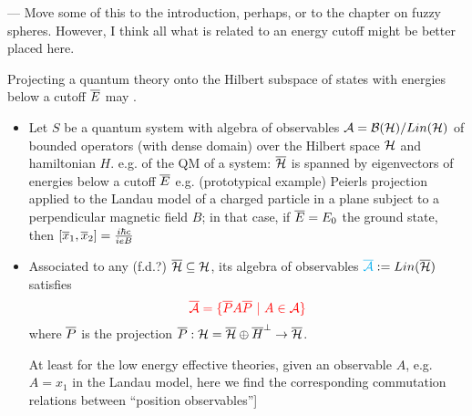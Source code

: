 { \color{gray}
    --- Move some of this to the introduction, perhaps, or to the chapter on fuzzy spheres. However, I think all what is related to an energy cutoff might be better placed here.
    
    \cite{FioreTheCase2020} Projecting a quantum theory onto the Hilbert subspace of states with energies below a cutoff $\overline{E}$ may . 
    
        \begin{itemize}
            
        \item Let $S$ be a quantum system with algebra of observables $\mathcal A = \mathcal B(\mathcal H)/Lin(\mathcal H)$ of bounded operators (with dense domain) over the Hilbert space $\mathcal H$ and hamiltonian $H$. e.g.  of the QM of a system: $\overline{\mathcal H}$ is spanned by eigenvectors of energies below a cutoff $\overline{E}$ e.g. (prototypical example) Peierls projection applied to the Landau model of a charged particle in a plane subject to a perpendicular magnetic field $B$; in that case, if $\overline{E} = E_0$ the ground state, then $[\overline{x}_1, \overline{x}_2] = \frac{i\hbar c}{ie B}$
        
        \item Associated to any (f.d.?) $\overline{\mathcal H} \subseteq \mathcal H$, its algebra of observables $\textcolor{cyan}{\overline{\mathcal A}} := Lin(\overline{\mathcal H})$ satisfies
        \begin{equation*}
            \textcolor{red}{\overline{\mathcal A} = \{ \overline{P} A \overline{P} \ |\  A \in \mathcal A\}} 
        \end{equation*}\todo{}
        where $\overline{P}$ is the projection $\overline{P} : \mathcal H = \overline{\mathcal H} \oplus \overline{H}^\perp \to \overline{\mathcal H}$. 
        
        At least for the low energy effective theories, given an observable $A$, e.g. $A = x_1$ in the Landau model,  here we find the corresponding commutation relations between ``position observables'']
        

\end{itemize}}
